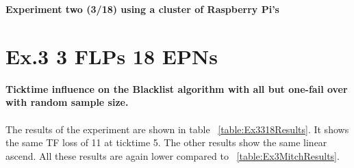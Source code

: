 \begin{table}[h!]
\caption*{\textbf{Experiment two (3/18) using a cluster of Raspberry Pi's}}
\caption{Cumulative lost TFs by ticktime/EPN ratio with a flat sample size for the Blacklist algorithm}
\label{table:Ex2318Results}
\end{table}

\section{Ex.3 3 FLPs 18 EPNs}
\textbf{Ticktime influence on the Blacklist algorithm with all but one-fail over with random sample size.}
\\~\\

The results of the experiment are shown in table ~\ref{table:Ex3318Results}. It shows the same TF loss of 11 at ticktime 5. The other results show the same linear ascend. All these results are again lower compared to ~\ref{table:Ex3MitchResults}.

